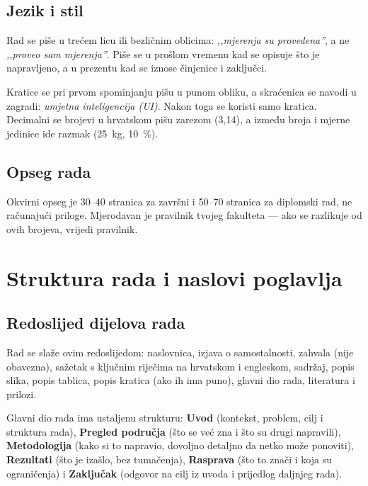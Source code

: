 \documentclass[12pt,a4paper,oneside]{report}
\begin{document}
\section{Jezik i stil}

Rad se piše u trećem licu ili bezličnim oblicima: \emph{,,mjerenja su provedena''}, a ne \emph{,,proveo sam mjerenja''}. Piše se u prošlom vremenu kad se opisuje što je napravljeno, a u prezentu kad se iznose činjenice i zaključci.

Kratice se pri prvom spominjanju pišu u punom obliku, a skraćenica se navodi u zagradi: \emph{umjetna inteligencija (UI)}. Nakon toga se koristi samo kratica. Decimalni se brojevi u hrvatskom pišu zarezom (3{,}14), a između broja i mjerne jedinice ide razmak (25~kg, 10~\%).

\section{Opseg rada}

Okvirni opseg je 30--40 stranica za završni i 50--70 stranica za diplomski rad, ne računajući priloge. Mjerodavan je pravilnik tvojeg fakulteta — ako se razlikuje od ovih brojeva, vrijedi pravilnik.

\chapter{Struktura rada i naslovi poglavlja}

\section{Redoslijed dijelova rada}

Rad se slaže ovim redoslijedom: naslovnica, izjava o samostalnosti, zahvala (nije obavezna), sažetak s ključnim riječima na hrvatskom i engleskom, sadržaj, popis slika, popis tablica, popis kratica (ako ih ima puno), glavni dio rada, literatura i prilozi.

Glavni dio rada ima ustaljenu strukturu: \textbf{Uvod} (kontekst, problem, cilj i struktura rada), \textbf{Pregled područja} (što se već zna i što su drugi napravili), \textbf{Metodologija} (kako si to napravio, dovoljno detaljno da netko može ponoviti), \textbf{Rezultati} (što je izašlo, bez tumačenja), \textbf{Rasprava} (što to znači i koja su ograničenja) i \textbf{Zaključak} (odgovor na cilj iz uvoda i prijedlog daljnjeg rada).
\end{document}
